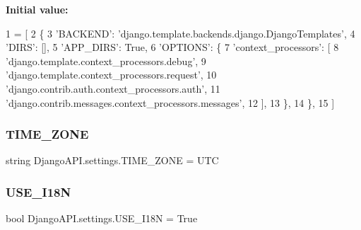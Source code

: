 {\bfseries Initial value\+:}
\begin{DoxyCode}
1 =  [
2     \{
3         \textcolor{stringliteral}{'BACKEND'}: \textcolor{stringliteral}{'django.template.backends.django.DjangoTemplates'},
4         \textcolor{stringliteral}{'DIRS'}: [],
5         \textcolor{stringliteral}{'APP\_DIRS'}: \textcolor{keyword}{True},
6         \textcolor{stringliteral}{'OPTIONS'}: \{
7             \textcolor{stringliteral}{'context\_processors'}: [
8                 \textcolor{stringliteral}{'django.template.context\_processors.debug'},
9                 \textcolor{stringliteral}{'django.template.context\_processors.request'},
10                 \textcolor{stringliteral}{'django.contrib.auth.context\_processors.auth'},
11                 \textcolor{stringliteral}{'django.contrib.messages.context\_processors.messages'},
12             ],
13         \},
14     \},
15 ]
\end{DoxyCode}
\mbox{\label{namespace_django_a_p_i_1_1settings_a14f07a099c10d075539d3eef77ea6681}} 
\subsubsection{\texorpdfstring{T\+I\+M\+E\+\_\+\+Z\+O\+NE}{TIME\_ZONE}}
{\footnotesize\ttfamily string Django\+A\+P\+I.\+settings.\+T\+I\+M\+E\+\_\+\+Z\+O\+NE = \textquotesingle{}U\+TC\textquotesingle{}}

\mbox{\label{namespace_django_a_p_i_1_1settings_a844ec0e1769a5c432283ad4ae6837c87}} 
\subsubsection{\texorpdfstring{U\+S\+E\+\_\+\+I18N}{USE\_I18N}}
{\footnotesize\ttfamily bool Django\+A\+P\+I.\+settings.\+U\+S\+E\+\_\+\+I18N = True}

\mbox{\label{namespace_django_a_p_i_1_1settings_aadfc85c481db7b3b5370df7cf2ca4424}} 
